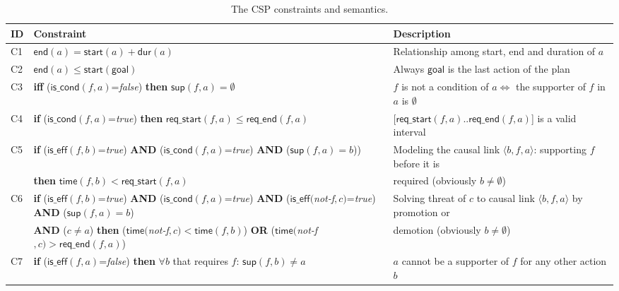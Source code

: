\documentclass{ecai}
\newcommand{\tup}[1]{{\langle #1 \rangle}}
\newcommand{\dur}{\mathsf{dur}}    %
\newcommand{\iscond}{\mathsf{is\_cond}}    %
\newcommand{\iseff}{\mathsf{is\_eff}}    %
\newcommand{\start}{\mathsf{start}}%
\newcommand{\en}{\mathsf{end}}     %
\newcommand{\supp}{\mathsf{sup}}   %
\newcommand{\tim}{\mathsf{time}}   %
\newcommand{\reqs}{\mathsf{req\_{start}}} %
\newcommand{\reqe}{\mathsf{req\_{end}}}   %
\newcommand{\goal}{\mathsf{goal}}  %
\begin{document}
\begin{table*}
\begin{center}
\caption{The CSP constraints and semantics.}	
\begin{scriptsize}
\begin{tabular}{lp{10.4cm}p{6.6cm}} %
\hline
{\bf ID}&{\bf Constraint}&{\bf Description}\\\hline
			
C1& $\en(a)=\start(a)+\dur(a)$ & Relationship among start, end and duration of $a$ \\

C2& $\en(a) \leq \start(\goal)$ & Always $\goal$ is the last action of the plan \\

C3& \textbf{iff} ($\iscond(f,a)$=\textit{false}) \textbf{then} $\supp(f,a) = \emptyset$ & $f$ is not a condition of $a \iff $ the supporter of $f$ in $a$ is $\emptyset$ \\

C4& \textbf{if} ($\iscond(f,a)$=\textit{true}) \textbf{then} $\reqs(f,a) \leq \reqe(f,a)$ & [$\reqs(f,a)..\reqe(f,a)$] is a valid interval\\

C5& \textbf{if} ($\iseff(f,b)$=\textit{true}) \textbf{AND} ($\iscond(f,a)$=\textit{true}) \textbf{AND} ($\supp(f,a)=b$))  & Modeling the causal link $\tup{b,f,a}$: supporting $f$ before it is \\
&\hspace{0.5cm}\textbf{then} $\tim(f,b) < \reqs(f,a)$ & required (obviously $b \neq \emptyset$) \\

C6& \textbf{if} ($\iseff(f,b)$=\textit{true}) \textbf{AND} ($\iscond(f,a)$=\textit{true}) \textbf{AND} ($\iseff($\textit{not-f}$,c)$=\textit{true}) \textbf{AND} ($\supp(f,a)=b$) & Solving threat of $c$ to causal link $\tup{b,f,a}$ by promotion or \\
&\hspace{0.5cm}\textbf{AND} ($c \neq a$) \textbf{then} ($\tim($\textit{not-f}$,c) < \tim(f,b)$) \textbf{OR} ($\tim($\textit{not-f}$,c) > \reqe(f,a)$) & demotion (obviously $b \neq \emptyset$) \\

C7& \textbf{if} ($\iseff(f,a)$=\textit{false}) \textbf{then} $\forall b$ that requires $f$: $\supp(f,b) \neq a$ & $a$ cannot be a supporter of $f$ for any other action $b$\\


\end{tabular}
\end{scriptsize}
\end{center}
\end{table*}
\end{document}
